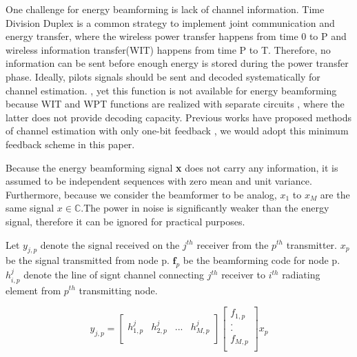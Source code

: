 One challenge for energy beamforming is lack of channel information. Time Division Duplex is a common strategy to implement joint communication and energy transfer, where the wireless power transfer happens from time 0 to P and wireless information transfer(WIT) happens from time P to T. Therefore, no information can be sent before enough energy is stored during the power transfer phase. Ideally, pilots signals should be sent and decoded systematically for channel estimation. \cite{1597555}, yet this function is not available for energy beamforming because WIT and WPT functions are realized with separate circuits \cite{7462480}, where the latter does not provide decoding capacity. Previous works have proposed methods of channel estimation with only one-bit feedback \cite{6884811}, we would adopt this minimum feedback scheme in this paper.

Because the energy beamforming signal \textbf{x} does not carry any information, it is assumed to be independent sequences with zero mean and unit variance. \cite{6884811} Furthermore, because we consider the beamformer to be analog, $x_1$ to $x_M$ are the same signal $x \in \mathbb{C}$.The power in noise is significantly weaker than the energy signal, therefore it can be ignored for practical purposes.

Let $y_{j,p}$ denote the signal received on the $j^{th}$ receiver from the $p^{th}$ transmitter. $x_p$ be the signal transmitted from node p. $\textbf{f}_p$ be the beamforming code for node p.  $h_{i,p}^j$ denote the line of signt channel connecting $j^{th}$ receiver to $i^{th}$ radiating element from $p^{th}$ transmitting node.

\[
y_{j,p}=
\begin{bmatrix}
h_{1,p}^j & h_{2,p}^j & ... & h_{M,p}^j\\
\end{bmatrix}
\begin{bmatrix}
f_{1,p}\\
.\\
.\\
f_{M,p}\\
\end{bmatrix}
x_p
\]



